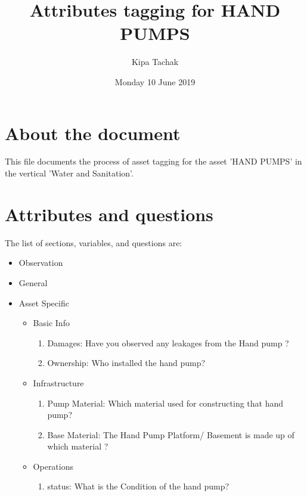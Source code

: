 \documentclass[oneside,twocolumn]{article}
\title{Attributes tagging for HAND PUMPS}
\author{Kipa Tachak}
\date{Monday 10 June 2019}
\begin{document}
\maketitle

\section{About the document}
This file documents the process of asset tagging for the asset 'HAND PUMPS' in the
vertical 'Water and Sanitation'.

\section{Attributes and questions}
The list of sections, variables, and questions are:
    \begin{itemize}
    \item Observation
    \item General
    \item Asset Specific
    \begin{itemize}
\item Basic Info
\begin{enumerate}
\item Damages: 
Have you observed any leakages from the Hand pump ? 

\item Ownership: Who installed the hand pump? 

\end{enumerate}

\item Infrastructure
\begin{enumerate}
\item Pump Material: Which material used for constructing that hand pump? 

\item Base Material: The Hand Pump Platform/ Basement is made up of which material ?
\end{enumerate}

\item Operations
\begin{enumerate}
\item status: 
What is the Condition of the hand pump? 

\end{enumerate}

\end{itemize}

    \end{itemize}
\end{document}
